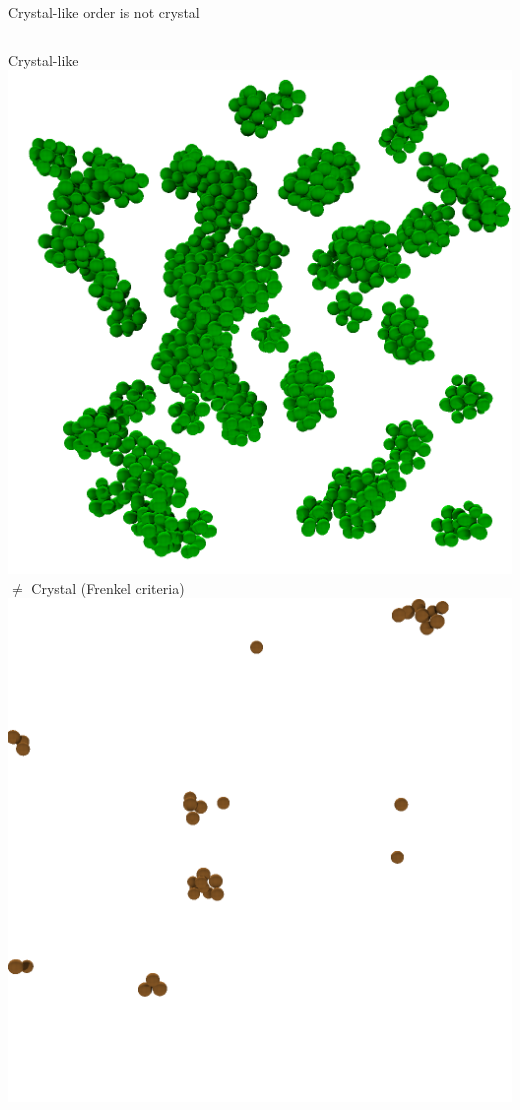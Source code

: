 \documentclass{beamer}
\begin{document}
\begin{frame}{Crystal-like order is not crystal}
	\begin{center}
	\begin{columns}
	Crystal-like\\
	\includegraphics[width=\textwidth]{mrco24_scale_go1_t040_t048.png} 
	{\Large $\neq$}
	Crystal (Frenkel criteria)
	\includegraphics[width=\textwidth]{X_go1.png}
	\end{columns}
	\end{center}
\end{frame}
\end{document}
